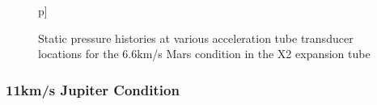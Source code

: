 \documentclass[a4paper,10pt]{article}
\begin{document}
\begin{figure}p]
\centering
{} \hspace{0cm}
 \caption{Static pressure histories at various acceleration tube transducer locations for the 6.6km/s Mars condition in the X2 expansion tube}
\label{fig:mars_atx} %
\end{figure}

\subsubsection{11km/s Jupiter Condition}
\end{document}
